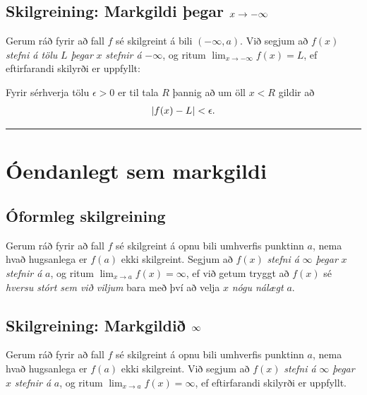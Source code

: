 \documentclass[b5paper,10pt,icelandic]{sphinxmanual}
\begin{document}
\subsection{Skilgreining: Markgildi þegar \protect\(x \to -\infty\protect\)}
\label{kafli02:id6}
Gerum ráð fyrir að fall \(f\) sé skilgreint á bili
\((-\infty,a)\). Við segjum að \(f(x)\) \emph{stefni á tölu}
\(L\) \emph{þegar} \(x\) \emph{stefnir á} \(-\infty\), og ritum
\(\lim_{x\rightarrow -\infty} f(x)=L\), ef eftirfarandi skilyrði er
uppfyllt:

Fyrir sérhverja tölu \(\epsilon>0\) er til tala \(R\)
þannig að um öll \(x<R\) gildir að
\begin{gather}
\begin{split}|f(x)-L|<\epsilon.\end{split}\notag
\end{gather}

\bigskip\hrule{}\bigskip



\section{Óendanlegt sem markgildi}
\label{kafli02:oendanlegt-sem-markgildi}

\subsection{Óformleg skilgreining}
\label{kafli02:id7}\label{kafli02:index-5}
Gerum ráð fyrir að fall \(f\) sé skilgreint á opnu bili umhverfis
punktinn \(a\), nema hvað hugsanlega er \(f(a)\) ekki
skilgreint. Segjum að \(f(x)\) \emph{stefni á} \(\infty\) \emph{þegar}
\(x\) \emph{stefnir á} \(a\), og ritum
\(\lim_{x\rightarrow a} f(x)=\infty\), ef við getum tryggt að
\(f(x)\) sé \emph{hversu stórt sem við viljum} bara með því að velja
\(x\) \emph{nógu nálægt} \(a\).


\subsection{Skilgreining: Markgildið \protect\(\infty\protect\)}
\label{kafli02:id8}
Gerum ráð fyrir að fall \(f\) sé skilgreint á opnu bili umhverfis
punktinn \(a\), nema hvað hugsanlega er \(f(a)\) ekki
skilgreint. Við segjum að \(f(x)\) \emph{stefni á} \(\infty\) \emph{þegar}
\(x\) \emph{stefnir á} \(a\), og ritum
\(\lim_{x\rightarrow a} f(x)=\infty\), ef eftirfarandi skilyrði er
uppfyllt.
\end{document}

